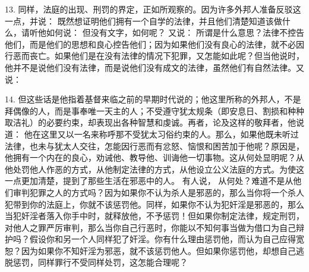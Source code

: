 13. 同样，法庭的出现、刑罚的界定，正如所观察的。因为许多外邦人准备反驳这一点，并说： 既然想证明他们拥有一个自学的法律，并且他们清楚知道该做什么，请听他如何说：  但没有文字，如何呢？  又说：  所谓是什么意思？法律不控告他们，而是他们的思想和良心控告他们；因为如果他们没有良心的法律，就不必因行恶而丧亡。如果他们是在没有法律的情况下犯罪，又怎能如此呢？但当他说时，他并不是说他们没有法律，而是说他们没有成文的法律，虽然他们有自然法律。又说： \par

14. 但这些话是他指着基督来临之前的早期时代说的；他这里所称的外邦人，不是拜偶像的人，而是事奉唯一天主的人；不受遵守犹太规条（即安息日、割损和种种取洁礼）的必要约束，却表现出各种智慧和虔诚。再者，论及这样的敬拜者，他说道：  他在这里又以一名来称呼那不受犹太习俗约束的人。那么，如果他既未听过法律，也未与犹太人交往，怎能因行恶而有忿怒、恼恨和困苦加于他呢？原因是，他拥有一个内在的良心，劝诫他、教导他、训诲他一切事物。这从何处显明呢？从他处罚他人作恶的方式，从他制定法律的方式，从他设立公义法庭的方式。为使这一点更加清楚，提到了那些生活在邪恶中的人。  有人说， 从何处？难道不是从他们审判犯罪之人的方式吗？因为如果你不认为杀人是邪恶的，那么当你将一个杀人犯带到你的法庭上，你就不该惩罚他。同样，如果你不认为犯奸淫是邪恶的，那么当犯奸淫者落入你手中时，就释放他，不予惩罚！但如果你制定法律，规定刑罚，对他人之罪严厉审判，那么当你自己行恶时，你能以不知何事当做为借口为自己辩护吗？假设你和另一个人同样犯了奸淫。你有什么理由惩罚他，而认为自己应得宽恕？因为如果你不知奸淫为邪恶，就不该惩罚他人。但如果你惩罚他，却想自己逃脱惩罚，同样罪行不受同样处罚，这怎能合理呢？\par

